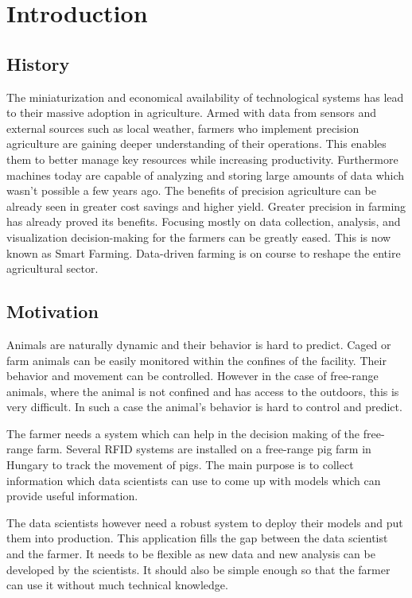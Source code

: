 \chapter{Introduction}
\label{ch:introduction}

\section{History}

The miniaturization and economical availability of technological systems has lead to their massive adoption
in agriculture. Armed with data from sensors and external sources such as local 
weather, farmers who implement precision agriculture are gaining deeper understanding of their operations.
This enables them to better manage key resources while increasing productivity. Furthermore machines 
today are capable of analyzing and storing large amounts of data which wasn't possible a few years ago. 
The benefits of precision agriculture can be already seen in greater cost savings and higher yield. 
Greater precision in farming has already proved its benefits. Focusing mostly on data collection, 
analysis, and visualization decision-making for the farmers can be greatly eased. This is now known 
as Smart Farming. Data-driven farming is on course to reshape the entire agricultural sector.

\section{Motivation}

Animals are naturally dynamic and their behavior is hard to predict. Caged or farm animals can 
be easily monitored within the confines of the facility. Their behavior and movement can be controlled. 
However in the case of free-range animals, where the animal is not confined and has access to the outdoors,
this is very difficult. In such a case the animal's behavior is hard to control and predict.

The farmer needs a system which can help in the decision making of the free-range farm.
Several RFID systems are installed on a free-range pig farm in Hungary to track the movement of pigs.
The main purpose is to collect information which data scientists can use to come up with models
which can provide useful information. 

The data scientists however need a robust system to deploy their models and put them into production.
This application fills the gap between the data scientist and the farmer. It needs to be flexible
as new data and new analysis can be developed by the scientists. It should also be simple
enough so that the farmer can use it without much technical knowledge.

